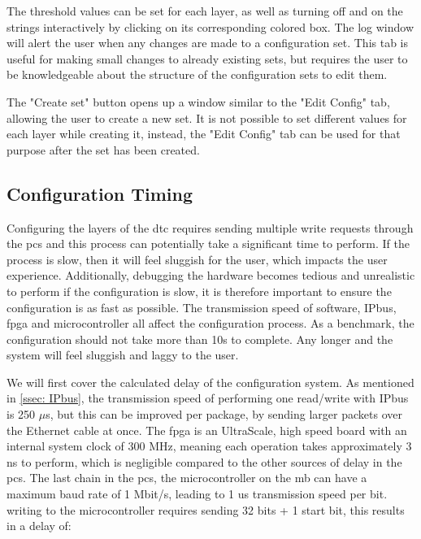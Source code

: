 \documentclass[main.tex]{subfiles}
\begin{document}
The threshold values can be set for each layer, as well as turning off and on the strings interactively by clicking on its corresponding colored box. The log window will alert the user when any changes are made to a configuration set. This tab is useful for making small changes to already existing sets, but requires the user to be knowledgeable about the structure of the configuration sets to edit them.

The "Create set" button opens up a window similar to the "Edit Config" tab, allowing the user to create a new set. It is not possible to set different values for each layer while creating it, instead, the "Edit Config" tab can be used for that purpose after the set has been created.


\subsection{Configuration Timing}
\label{ssec: con_timing}

Configuring the layers of the \gls{dtc} requires sending multiple write requests through the \gls{pcs} and this process can potentially take a significant time to perform. If the process is slow, then it will feel sluggish for the user, which impacts the user experience. Additionally, debugging the hardware becomes tedious and unrealistic to perform if the configuration is slow, it is therefore important to ensure the configuration is as fast as possible. The transmission speed of software, IPbus, \gls{fpga} and microcontroller all affect the configuration process. As a benchmark, the configuration should not take more than 10s to complete. Any longer and the system will feel sluggish and laggy to the user.

We will first cover the calculated delay of the configuration system. As mentioned in \autoref{ssec: IPbus}, the transmission speed of performing one read/write with IPbus is 250 $\mu$s, but this can be improved per package, by sending larger packets over the Ethernet cable at once. The \gls{fpga} is an UltraScale, high speed board with an internal system clock of 300 MHz, meaning each operation takes approximately 3 ns to perform, which is negligible compared to the other sources of delay in the \gls{pcs}. The last chain in the \gls{pcs}, the microcontroller on the \gls{mb} can have a maximum baud rate of 1 Mbit/s, leading to 1 us transmission speed per bit. writing to the microcontroller requires sending 32 bits + 1 start bit, this results in a delay of: 
\end{document}
